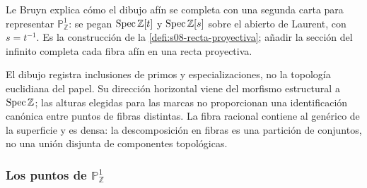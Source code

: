 \begin{obs}
\label{obs:s08-lectura-lebruyn}
Le Bruyn \cite[\S1, pp.~6--9]{lebruyn2013} explica cómo el dibujo afín se completa con una segunda carta para representar $\mathbb P_{\mathbb Z}^1$: se pegan $\operatorname{Spec}\mathbb Z[t]$ y $\operatorname{Spec}\mathbb Z[s]$ sobre el abierto de Laurent, con $s=t^{-1}$. Es la construcción de la \cref{defi:s08-recta-proyectiva}; añadir la sección del infinito completa cada fibra afín en una recta proyectiva.

El dibujo registra inclusiones de primos y especializaciones, no la topología euclidiana del papel. Su dirección horizontal viene del morfismo estructural a $\operatorname{Spec}\mathbb Z$; las alturas elegidas para las marcas no proporcionan una identificación canónica entre puntos de fibras distintas. La fibra racional contiene al genérico de la superficie y es densa: la descomposición en fibras es una partición de conjuntos, no una unión disjunta de componentes topológicas.
\end{obs}

\subsubsection{Los puntos de \texorpdfstring{$\mathbb P_{\mathbb Z}^1$}{P1Z}}

